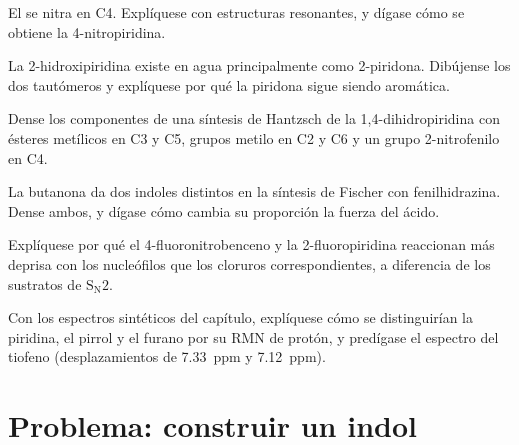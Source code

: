 \begin{exercise}[$\star\star$]\label{exo:b3:heterocycles:7}
El  se nitra en C4. Explíquese con estructuras resonantes, y dígase cómo
se obtiene la 4-nitropiridina.
\end{exercise}

\begin{exercise}[$\star\star$]\label{exo:b3:heterocycles:8}
La 2-hidroxipiridina existe en agua principalmente como 2-piridona. Dibújense los dos tautómeros y
explíquese por qué la piridona sigue siendo aromática.
\end{exercise}

\begin{exercise}[$\star\star$]\label{exo:b3:heterocycles:9}
Dense los componentes de una síntesis de Hantzsch de la 1,4-dihidropiridina con
ésteres metílicos en C3 y C5, grupos metilo en C2 y C6 y un grupo 2-nitrofenilo
en C4.
\end{exercise}

\begin{exercise}[$\star\star\star$]\label{exo:b3:heterocycles:10}
La butanona da dos indoles distintos en la síntesis de Fischer con
fenilhidrazina. Dense ambos, y dígase cómo cambia su proporción la fuerza del ácido.
\end{exercise}

\begin{exercise}[$\star\star\star$]\label{exo:b3:heterocycles:11}
Explíquese por qué el 4-fluoronitrobenceno y la 2-fluoropiridina reaccionan más deprisa con los
nucleófilos que los cloruros correspondientes, a diferencia de los sustratos de $\mathrm S_\mathrm N2$.
\end{exercise}

\begin{exercise}[$\star\star\star$]\label{exo:b3:heterocycles:12}
Con los espectros sintéticos del capítulo, explíquese cómo se distinguirían la piridina,
el pirrol y el furano por su RMN de protón, y predígase el espectro del
tiofeno (desplazamientos de \qty{7.33}{ppm} y \qty{7.12}{ppm}).
\end{exercise}

\section{Problema: construir un indol}


